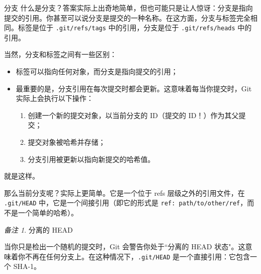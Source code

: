 \documentclass[aspectratio=169,xcolor=dvipsnames]{beamer}
\theoremstyle{remark}
\newtheorem*{remark}{备注}
\begin{document}
\begin{frame}{分支}
什么是分支？答案实际上出奇地简单，但也可能只是让人惊讶：分支是指向提交的引用。你甚至可以说分支是提交的一种名称。在这方面，分支与标签完全相同。标签是位于 \lstinline|.git/refs/tags| 中的引用，分支是位于 \lstinline|.git/refs/heads| 中的引用。

当然，分支和标签之间有一些区别：
\begin{itemize}
    \item 标签可以指向任何对象，而分支是指向提交的引用；
    \item 最重要的是，分支引用在每次提交时都会更新。这意味着每当你提交时，Git 实际上会执行以下操作：
    \begin{enumerate}
        \item 创建一个新的提交对象，以当前分支的 ID（提交的 ID！）作为其父提交；
        \item 提交对象被哈希并存储；
        \item 分支引用被更新以指向新提交的哈希值。
    \end{enumerate}
\end{itemize}
就是这样。

那么当前分支呢？实际上更简单。它是一个位于 refs 层级之外的引用文件，在 \lstinline|.git/HEAD| 中，它是一个间接引用（即它的形式是 \lstinline|ref: path/to/other/ref|，而不是一个简单的哈希）。
    \begin{remark}分离的 HEAD

    当你只是检出一个随机的提交时，Git 会警告你处于``分离的 HEAD 状态"。这意味着你不再在任何分支上。在这种情况下，\lstinline|.git/HEAD| 是一个直接引用：它包含一个 SHA-1。\end{remark}
\end{frame}
\end{document}
